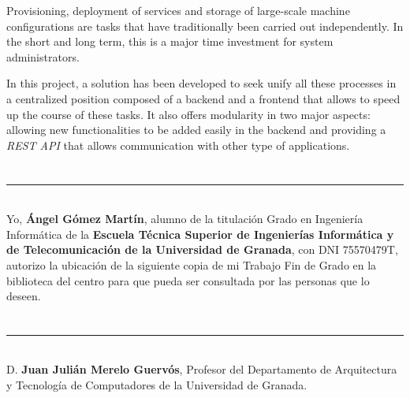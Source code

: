 Provisioning, deployment of services and storage of large-scale machine configurations are tasks that have traditionally been carried out independently. In the short and long term, this is a major time investment for system administrators.

\bigskip
In this project, a solution has been developed to seek unify all these processes in a centralized position composed of a backend and a frontend that allows to speed up the course of these tasks. It also offers modularity in two major aspects: allowing new functionalities to be added easily in the backend and providing a \textit{REST API} that allows communication with other type of applications.











\chapter*{}
\thispagestyle{empty}

\noindent\rule[-1ex]{\textwidth}{2pt}\\[4.5ex]

Yo, \textbf{Ángel Gómez Martín}, alumno de la titulación Grado en Ingeniería Informática de la \textbf{Escuela Técnica Superior de Ingenierías Informática y de Telecomunicación de la Universidad de Granada}, con DNI 75570479T, autorizo la ubicación de la siguiente copia de mi Trabajo Fin de Grado en la biblioteca del centro para que pueda ser consultada por las personas que lo deseen.

\vspace{6cm}


\vspace{2cm}












\chapter*{}
\thispagestyle{empty}

\noindent\rule[-1ex]{\textwidth}{2pt}\\[4.5ex]

D. \textbf{Juan Julián Merelo Guervós}, Profesor del Departamento de Arquitectura y Tecnología de Computadores de la Universidad de Granada.

